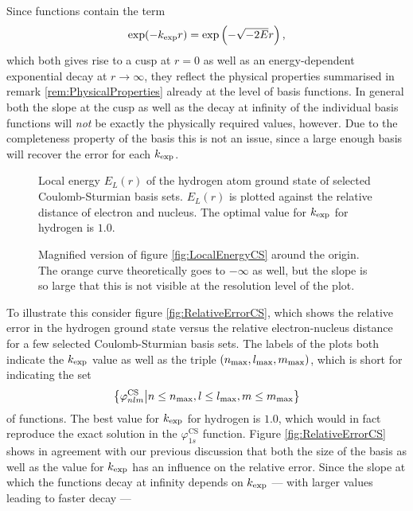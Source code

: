 \noindent
Since \CS functions contain the term
\[ \exp(-k_\text{exp} r) = \exp\left( - \sqrt{-2E}r \right), \]
which both gives rise to a cusp at $r=0$ as well as
an energy-dependent exponential decay at $r\to\infty$,
they reflect the physical properties summarised in remark \vref{rem:PhysicalProperties}
already at the level of basis functions.
In general both the slope at the cusp as well as the decay at infinity
of the individual basis functions will \emph{not} be exactly the physically
required values, however.
Due to the completeness property of the \CS basis
this is not an issue, since a large enough basis will recover the error
for each $k_\text{exp}$.%
%
\begin{figure}[p]
	\centering
	\caption[Local energy of the hydrogen \HF ground state for {\CS} bases]{
		Local energy $E_L(r)$ of the hydrogen atom \HF ground state
		of selected Coulomb-Sturmian basis sets.
		$E_L(r)$ is plotted against the relative distance
		of electron and nucleus.
		The optimal value for $k_\text{exp}$ for hydrogen is $1.0$.
	}
	\label{fig:LocalEnergyCS}
\end{figure}
%
\begin{figure}[p]
	\centering
	\caption[Local energy of the hydrogen \HF ground state for {\cGTO}s (magnified)]{
		Magnified version of figure \vref{fig:LocalEnergyCS}
		around the origin.
		The orange curve theoretically goes to $-\infty$ as well,
		but the slope is so large that this is not visible
		at the resolution level of the plot.
	}
	\label{fig:LocalEnergyCSZoom}
\end{figure}
%
To illustrate this consider figure \vref{fig:RelativeErrorCS},
which shows the relative error in the hydrogen ground state
versus the relative electron-nucleus distance
for a few selected Coulomb-Sturmian basis sets.
The labels of the plots both indicate the $k_\text{exp}$ value as well as the
triple  $(n_\text{max}, l_\text{max}, m_\text{max})$, which is short for indicating
the set
\[ \left\{ \varphi^\text{CS}_{nlm} \middle| n \leq n_\text{max}, l \leq l_\text{max}, m \leq m_\text{max} \right\} \]
of \CS functions.
The best value for $k_\text{exp}$ for hydrogen is $1.0$,
which would in fact reproduce the exact solution in the $\varphi^\text{CS}_{1s}$ function.
Figure \vref{fig:RelativeErrorCS} shows in agreement with our previous discussion
that both the size of the basis as well as the value for $k_\text{exp}$ has an influence
on the relative error.
Since the slope at which the \CS functions decay
at infinity depends on $k_\text{exp}$ ---
with larger values leading to faster decay ---
